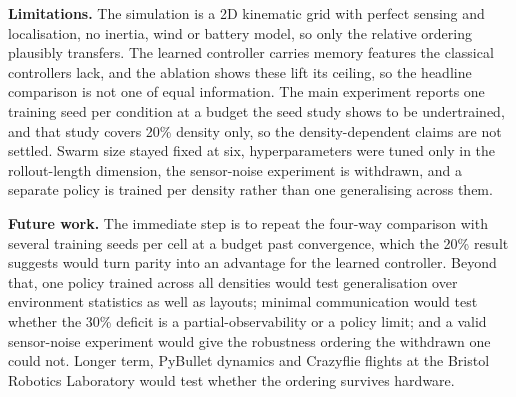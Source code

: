 \documentclass[a4paper, 10pt, conference]{ieeeconf}
\begin{document}
\textbf{Limitations.} The simulation is a 2D kinematic grid with
perfect sensing and localisation, no inertia, wind or battery model,
so only the relative ordering plausibly transfers. The learned
controller carries memory features the classical controllers lack, and
the ablation shows these lift its ceiling, so the headline comparison
is not one of equal information. The main experiment reports one
training seed per condition at a budget the seed study shows to be
undertrained, and that study covers 20\% density only, so the
density-dependent claims are not settled. Swarm size stayed fixed at
six, hyperparameters were tuned only in the rollout-length dimension,
the sensor-noise experiment is withdrawn, and a separate policy is
trained per density rather than one generalising across them.

\textbf{Future work.} The immediate step is to repeat the four-way
comparison with several training seeds per cell at a budget past
convergence, which the 20\% result suggests would turn parity into an
advantage for the learned controller. Beyond that, one policy trained
across all densities would test generalisation over environment
statistics as well as layouts; minimal communication would test
whether the 30\% deficit is a partial-observability or a policy limit;
and a valid sensor-noise experiment would give the robustness ordering
the withdrawn one could not. Longer term, PyBullet dynamics and
Crazyflie flights at the Bristol Robotics Laboratory would test
whether the ordering survives hardware.

{\footnotesize\linespread{0.90}\selectfont


}
\end{document}
